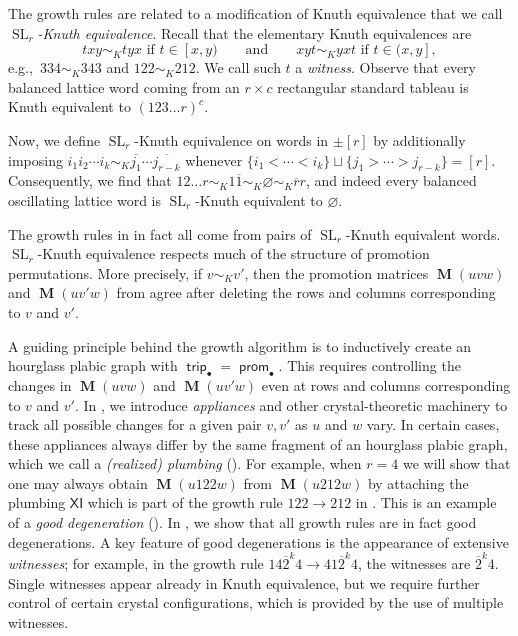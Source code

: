 \documentclass{amsart}
\theoremstyle{definition}
\theoremstyle{remark}
\numberwithin{equation}{section}
\DeclareMathOperator{\trip}{\mathsf{trip}}
\DeclareMathOperator{\prom}{\mathsf{prom}}
\DeclareMathOperator{\PM}{\mathbf{M}}
\DeclareMathOperator{\SL}{SL}
\begin{document}
The growth rules are related to a modification of Knuth equivalence that we call \emph{$\SL_r$-Knuth equivalence}. Recall that the elementary Knuth equivalences are
\begin{equation}
  txy \sim_K tyx\text{ if }t \in [x, y) \qquad\text{and}\qquad xyt \sim_K yxt\text{ if }t \in (x, y],
\end{equation}
e.g.,~$334 \sim_K 343$ and $122 \sim_K 212$. We call such $t$ a \textit{witness}. Observe that every balanced lattice word coming from an $r \times c$ rectangular standard tableau is Knuth equivalent to $(123\ldots r)^c$.

Now, we define $\SL_r$-Knuth equivalence on words in $\pm [r]$ by additionally imposing $i_1 i_2 \cdots i_k \sim_K \overline{j_1} \cdots \overline{j_{r-k}}$ whenever $\{i_1 < \cdots < i_k\} \sqcup \{j_1 > \cdots > j_{r-k}\} = [r]$. Consequently, we find that $12\ldots r \sim_K 1\overline{1} \sim_K \varnothing \sim_K \overline{r}r$, and indeed every balanced oscillating lattice word is $\SL_r$-Knuth equivalent to $\varnothing$.

The growth rules in  in fact all come from pairs of $\SL_r$-Knuth equivalent words. $\SL_r$-Knuth equivalence respects much of the structure of promotion permutations. More precisely, if $v \sim_K v'$, then the promotion matrices $\PM(uvw)$ and $\PM(uv'w)$ from  agree after deleting the rows and columns corresponding to $v$ and $v'$.

A guiding principle behind the growth algorithm is to inductively create an hourglass plabic graph with $\trip_\bullet = \prom_\bullet$. This requires controlling the changes in $\PM(uvw)$ and $\PM(uv'w)$ even at rows and columns corresponding to $v$ and $v'$. In , we introduce \textit{appliances} and other crystal-theoretic machinery to track all possible changes for a given pair $v, v'$ as $u$ and $w$ vary. In certain cases, these appliances always differ by the same fragment of an hourglass plabic graph, which we call a \textit{(realized) plumbing} (). For example, when $r=4$ we will show that one may always obtain $\PM(u122w)$ from $\PM(u212w)$ by attaching the plumbing $\mathsf{XI}$ which is part of the growth rule $122 \to 212$ in . This is an example of a \textit{good degeneration} ().  In , we show that all growth rules are in fact good degenerations. A key feature of good degenerations is the appearance of extensive \textit{witnesses}; for example, in the growth rule $14\overline{2}^k4 \to 41\overline{2}^k4$, the witnesses are $\overline{2}^k4$. Single witnesses appear already in Knuth equivalence, but we require further control of certain crystal configurations, which is provided by the use of multiple witnesses.
\end{document}
